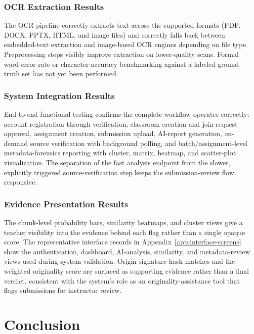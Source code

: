 \documentclass[12pt, a4paper]{report}
\numberwithin{equation}{chapter}
\begin{document}
\subsection{OCR Extraction Results}

The OCR pipeline correctly extracts text across the supported formats (PDF, DOCX, PPTX, HTML, and image files) and correctly falls back between embedded-text extraction and image-based OCR engines depending on file type. Preprocessing steps visibly improve extraction on lower-quality scans. Formal word-error-rate or character-accuracy benchmarking against a labeled ground-truth set has not yet been performed.

\subsection{System Integration Results}

End-to-end functional testing confirms the complete workflow operates correctly: account registration through verification, classroom creation and join-request approval, assignment creation, submission upload, AI-report generation, on-demand source verification with background polling, and batch/assignment-level metadata-forensics reporting with cluster, matrix, heatmap, and scatter-plot visualization. The separation of the fast analysis endpoint from the slower, explicitly triggered source-verification step keeps the submission-review flow responsive.

\subsection{Evidence Presentation Results}

The chunk-level probability bars, similarity heatmaps, and cluster views give a teacher visibility into the evidence behind each flag rather than a single opaque score. The representative interface records in Appendix~\ref{app:interface-screens} show the authentication, dashboard, AI-analysis, similarity, and metadata-review views used during system validation. Origin-signature hash matches and the weighted originality score are surfaced as supporting evidence rather than a final verdict, consistent with the system's role as an originality-assistance tool that flags submissions for instructor review.
\chapter{Conclusion}
\end{document}
